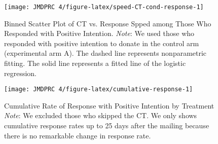 \documentclass[12pt, a4paper]{article}
\begin{document}
\begin{figure}[H]
\texttt{[image: JMDPRC~4/figure-latex/speed-CT-cond-response-1]} \caption{Binned Scatter Plot of CT vs. Response Spped among Those Who Responded with Positive Intention. \newline \emph{Note}: We used those who responded with positive intention to donate in the control arm (experimental arm A). The dashed line represents nonparametric fitting. The solid line represents a fitted line of the logistic regression.}\label{fig:speed-CT-cond-response}
\end{figure}

\begin{figure}[t]
\texttt{[image: JMDPRC~4/figure-latex/cumulative-response-1]} \caption{Cumulative Rate of Response with Positive Intention by Treatment \newline \emph{Note}: We excluded those who skipped the CT. We only shows cumulative response rates up to 25 days after the mailing because there is no remarkable change in response rate.}\label{fig:cumulative-response}
\end{figure}
\end{document}
